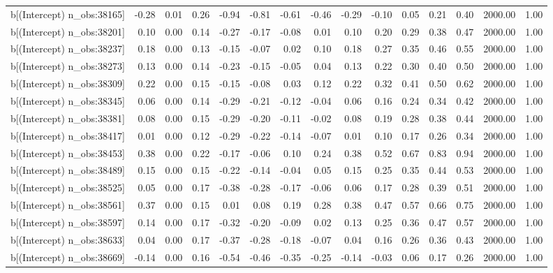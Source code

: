 \begin{table}[ht]
\begin{tabular}{rrrrrrrrrrrrrrr}
  b[(Intercept) n\_obs:38165] & -0.28 & 0.01 & 0.26 & -0.94 & -0.81 & -0.61 & -0.46 & -0.29 & -0.10 & 0.05 & 0.21 & 0.40 & 2000.00 & 1.00 \\ 
  b[(Intercept) n\_obs:38201] & 0.10 & 0.00 & 0.14 & -0.27 & -0.17 & -0.08 & 0.01 & 0.10 & 0.20 & 0.29 & 0.38 & 0.47 & 2000.00 & 1.00 \\ 
  b[(Intercept) n\_obs:38237] & 0.18 & 0.00 & 0.13 & -0.15 & -0.07 & 0.02 & 0.10 & 0.18 & 0.27 & 0.35 & 0.46 & 0.55 & 2000.00 & 1.00 \\ 
  b[(Intercept) n\_obs:38273] & 0.13 & 0.00 & 0.14 & -0.23 & -0.15 & -0.05 & 0.04 & 0.13 & 0.22 & 0.30 & 0.40 & 0.50 & 2000.00 & 1.00 \\ 
  b[(Intercept) n\_obs:38309] & 0.22 & 0.00 & 0.15 & -0.15 & -0.08 & 0.03 & 0.12 & 0.22 & 0.32 & 0.41 & 0.50 & 0.62 & 2000.00 & 1.00 \\ 
  b[(Intercept) n\_obs:38345] & 0.06 & 0.00 & 0.14 & -0.29 & -0.21 & -0.12 & -0.04 & 0.06 & 0.16 & 0.24 & 0.34 & 0.42 & 2000.00 & 1.00 \\ 
  b[(Intercept) n\_obs:38381] & 0.08 & 0.00 & 0.15 & -0.29 & -0.20 & -0.11 & -0.02 & 0.08 & 0.19 & 0.28 & 0.38 & 0.44 & 2000.00 & 1.00 \\ 
  b[(Intercept) n\_obs:38417] & 0.01 & 0.00 & 0.12 & -0.29 & -0.22 & -0.14 & -0.07 & 0.01 & 0.10 & 0.17 & 0.26 & 0.34 & 2000.00 & 1.00 \\ 
  b[(Intercept) n\_obs:38453] & 0.38 & 0.00 & 0.22 & -0.17 & -0.06 & 0.10 & 0.24 & 0.38 & 0.52 & 0.67 & 0.83 & 0.94 & 2000.00 & 1.00 \\ 
  b[(Intercept) n\_obs:38489] & 0.15 & 0.00 & 0.15 & -0.22 & -0.14 & -0.04 & 0.05 & 0.15 & 0.25 & 0.35 & 0.44 & 0.53 & 2000.00 & 1.00 \\ 
  b[(Intercept) n\_obs:38525] & 0.05 & 0.00 & 0.17 & -0.38 & -0.28 & -0.17 & -0.06 & 0.06 & 0.17 & 0.28 & 0.39 & 0.51 & 2000.00 & 1.00 \\ 
  b[(Intercept) n\_obs:38561] & 0.37 & 0.00 & 0.15 & 0.01 & 0.08 & 0.19 & 0.28 & 0.38 & 0.47 & 0.57 & 0.66 & 0.75 & 2000.00 & 1.00 \\ 
  b[(Intercept) n\_obs:38597] & 0.14 & 0.00 & 0.17 & -0.32 & -0.20 & -0.09 & 0.02 & 0.13 & 0.25 & 0.36 & 0.47 & 0.57 & 2000.00 & 1.00 \\ 
  b[(Intercept) n\_obs:38633] & 0.04 & 0.00 & 0.17 & -0.37 & -0.28 & -0.18 & -0.07 & 0.04 & 0.16 & 0.26 & 0.36 & 0.43 & 2000.00 & 1.00 \\ 
  b[(Intercept) n\_obs:38669] & -0.14 & 0.00 & 0.16 & -0.54 & -0.46 & -0.35 & -0.25 & -0.14 & -0.03 & 0.06 & 0.17 & 0.26 & 2000.00 & 1.00 \\ 

\end{tabular}
\end{table}
